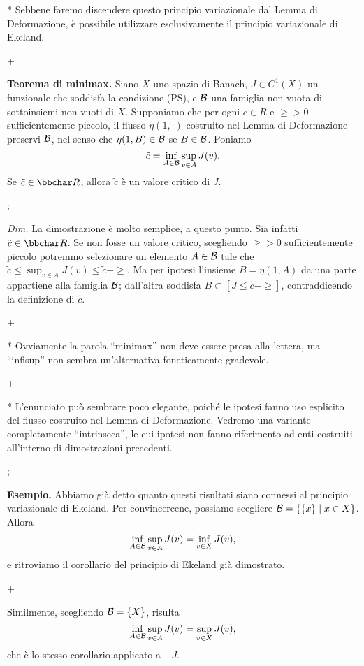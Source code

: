 * Sebbene faremo discendere questo principio variazionale dal Lemma di
  Deformazione, \`e possibile utilizzare esclusivamente il principio
  variazionale di Ekeland.

\pg+

{\bf Teorema di minimax.} Siano $X$ uno spazio di Banach, $J \in
C^1(X)$ un funzionale che soddisfa la condizione (PS), e ${\cal B}$
una famiglia non vuota di sottoinsiemi non vuoti di $X$. Supponiamo
che per ogni $c \in R$ e $\ge>0$ sufficientemente piccolo, il flusso
$\eta(1,\cdot)$ costruito nel Lemma di Deformazione preservi ${\cal
B}$, nel senso che $\eta(1,B) \in {\cal B}$ se $B \in {\cal
B}$. Poniamo
$$
\tilde{c} = \inf_{A \in {\cal B}} \sup_{v \in A} J(v).
$$
Se $\tilde{c} \in \R$, allora $\tilde{c}$ \`e un valore critico di $J$.

\pg;

{\em Dim.} La dimostrazione \`e molto semplice, a questo punto. Sia
infatti $\tilde{c} \in \R$. Se non fosse un valore critico, scegliendo
$\ge>0$ sufficientemente piccolo potremmo selezionare un elemento $A
\in {\cal B}$ tale che $\tilde{c} \leq \sup_{v \in A} J(v) \leq
\tilde{c}+\ge$. Ma per ipotesi l'insieme $B = \eta(1,A)$ da una parte
appartiene alla famiglia ${\cal B}$; dall'altra soddisfa $B \subset [J
\leq \tilde{c}-\ge]$, contraddicendo la definizione di $\tilde{c}$.

\pg+

* Ovviamente la parola ``minimax'' non deve essere presa alla lettera,
  ma ``infisup'' non sembra un'alternativa foneticamente gradevole.

\pg+

* L'enunciato pu\`o sembrare poco elegante, poich\'e le ipotesi fanno
  uso esplicito del flusso costruito nel Lemma di
  Deformazione. Vedremo una variante completamente ``intrinseca'', le
  cui ipotesi non fanno riferimento ad enti costruiti all'interno di
  dimostrazioni precedenti.

\pg;

{\bf Esempio.} Abbiamo gi\`a detto quanto questi risultati siano
connessi al principio variazionale di Ekeland. Per convincercene,
possiamo scegliere ${\cal B} = \{\{x\}\mid x \in X\}$. Allora
$$\inf_{A\in{\cal B}} \sup_{v \in A} J(v) = \inf_{v \in X} J(v),$$
e ritroviamo il corollario del principio di Ekeland gi\`a dimostrato.

\pg+

Similmente, scegliendo ${\cal B} = \{X\}$, risulta
$$
\inf_{A \in {\cal B}} \sup_{v \in A} J(v) = \sup_{v \in X} J(v),
$$
che \`e lo stesso corollario applicato a $-J$.

